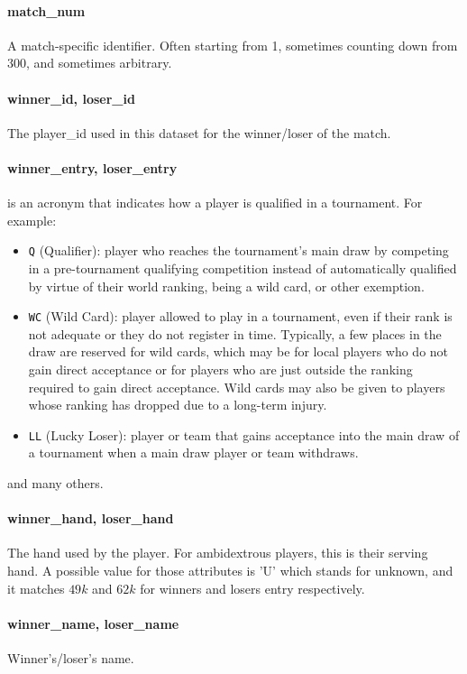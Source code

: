 \documentclass{article}
\begin{document}
\paragraph{match\_num}
A match-specific identifier. Often starting from 1, sometimes counting down from 300, and sometimes arbitrary.

\paragraph{winner\_id, loser\_id}
The player\_id used in this dataset for the winner/loser of the match.

\paragraph{winner\_entry, loser\_entry}
is an acronym that indicates how a player is qualified in a tournament. For example:
\begin{itemize}
    \item \verb|Q| (Qualifier): player who reaches the tournament's main draw by competing in a pre-tournament qualifying competition instead of automatically qualified by virtue of their world ranking, being a wild card, or other exemption.
    \item \verb|WC| (Wild Card): player allowed to play in a tournament, even if their rank is not adequate or they do not register in time. Typically, a few places in the draw are reserved for wild cards, which may be for local players who do not gain direct acceptance or for players who are just outside the ranking required to gain direct acceptance. Wild cards may also be given to players whose ranking has dropped due to a long-term injury.
    \item \verb|LL| (Lucky Loser): player or team that gains acceptance into the main draw of a tournament when a main draw player or team withdraws.
\end{itemize}
and many others.

\paragraph{winner\_hand, loser\_hand}
The hand used by the player. For ambidextrous players, this is their serving hand. A possible value for those attributes is 'U' which stands for unknown, and it matches $49k$ and $62k$ for winners and losers entry respectively.

\paragraph{winner\_name, loser\_name}
Winner's/loser's name.
\end{document}
